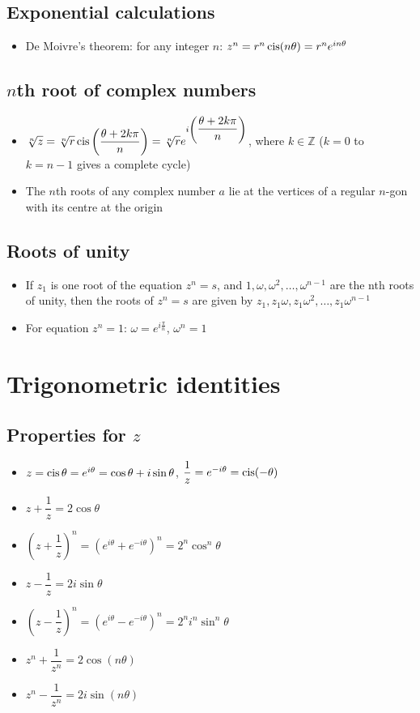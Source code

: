 \subsection{Exponential calculations}
\begin{itemize}
    \item De Moivre's theorem: for any integer $n$: $z^n = r^n\operatorname{cis}(n\theta)=r^ne^{in\theta}$
\end{itemize}

\subsection{$n$th root of complex numbers}
\begin{itemize}
    \item $\sqrt[n]{z}=\sqrt[n]{r}\operatorname{cis}\left(\dfrac{\theta+2k\pi}{n}\right)=\sqrt[n]{r}e^{i\left(\dfrac{\theta+2k\pi}{n}\right)}$, where $k\in \mathbb{Z}$ ($k=0$ to $k=n-1$ gives a complete cycle)
    \item The $n$th roots of any complex number $a$ lie at the vertices of a regular $n$-gon with its centre at the origin
\end{itemize}

\subsection{Roots of unity}
\begin{itemize}
    \item If $z_1$ is one root of the equation $z^n=s$, and $1,\omega,\omega^2,\dots,\omega^{n-1}$ are the nth roots of unity, then the roots of $z^n=s$ are given by $z_1, z_1\omega, z_1\omega^2, \dots, z_1\omega^{n-1}$
    \item For equation $z^n=1$: $\omega=e^{i\frac{\pi}{n}}$, $\omega^n=1$
\end{itemize}


\section{Trigonometric identities}
\subsection{Properties for $z$}
\begin{itemize}
    \item $z=\operatorname{cis}\theta=e^{i\theta}=\cos\theta + i\sin\theta$, $\dfrac{1}{z} = e^{-i\theta} = \operatorname{cis} (-\theta)$
    \item $z+\dfrac{1}{z}=2\cos\theta$
    \item $\left(z+\dfrac{1}{z}\right)^n=\left(e^{i\theta}+e^{-i\theta}\right)^n=2^n\cos^n\theta$
    \item $z-\dfrac{1}{z}=2i\sin\theta$
    \item $\left(z-\dfrac{1}{z}\right)^n=\left(e^{i\theta}-e^{-i\theta}\right)^n=2^n i^n \sin^n\theta$
    \item $z^n+\dfrac{1}{z^n}=2\cos (n\theta)$
    \item $z^n-\dfrac{1}{z^n}=2i\sin (n\theta)$
\end{itemize}
